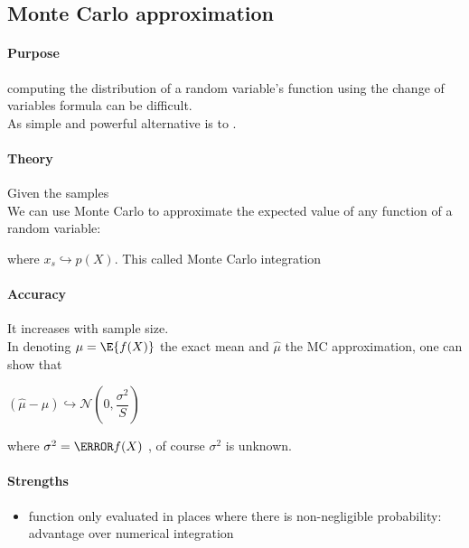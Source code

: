 \subsection{Monte Carlo approximation}
\paragraph{Purpose}
computing the distribution of a random variable's function using the change of variables formula can
be difficult.\\
As simple and powerful alternative is to .
\paragraph{Theory}
Given the samples \\
We can use Monte Carlo to approximate the expected value of any function of a random variable:
\begin{center}
\end{center}
where $x_{s}\hookrightarrow p(X)$. This called Monte Carlo integration
\paragraph{Accuracy}
It increases with sample size.\\
In denoting $\mu = \E{f(X)}$ the exact mean and $\hat{\mu}$ the MC approximation, one can show that
\begin{center}
    $(\hat{\mu} - \mu) \hookrightarrow \mathcal{N}\left(0, \dfrac{\sigma^{2}}{S}\right)$
\end{center}
where $\sigma^{2} = \V{f(X)}$ , of course 
$\sigma^{2}$ is unknown.\\

\paragraph{Strengths}
\begin{itemize}
    \item function only evaluated in places where there is non-negligible probability: advantage over
        numerical integration 
\end{itemize}
